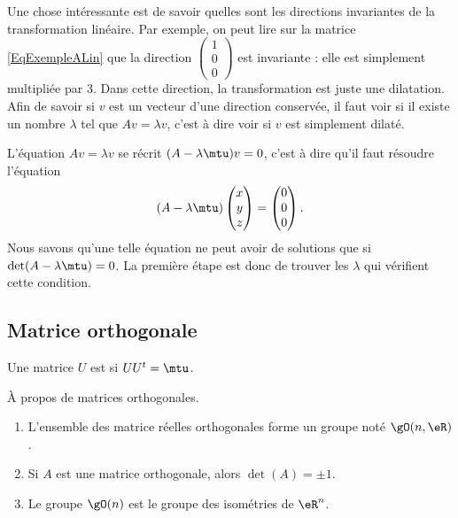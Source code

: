 Une chose intéressante est de savoir quelles sont les directions invariantes de la transformation linéaire. Par exemple, on peut lire sur la matrice \eqref{EqExempleALin} que la direction $\begin{pmatrix}
	1	\\ 
	0	\\ 
	0	
\end{pmatrix}$ est invariante : elle est simplement multipliée par $3$. Dans cette direction, la transformation est juste une dilatation. Afin de savoir si $v$ est un vecteur d'une direction conservée, il faut voir si il existe un nombre $\lambda$ tel que $Av=\lambda v$, c'est à dire voir si $v$ est simplement dilaté.

L'équation $Av=\lambda v$ se récrit $(A-\lambda\mtu)v=0$, c'est à dire qu'il faut résoudre l'équation
\begin{equation}
	(A-\lambda\mtu)\begin{pmatrix}
		x	\\ 
		y	\\ 
		z	
	\end{pmatrix}=
	\begin{pmatrix}
		0	\\ 
		0	\\ 
		0	
	\end{pmatrix}.
\end{equation}
Nous savons qu'une telle équation ne peut avoir de solutions que si $\det(A-\lambda\mtu)=0$. La première étape est donc de trouver les $\lambda$ qui vérifient cette condition.

\subsection{Matrice orthogonale}

\begin{definition}
    Une matrice \( U\) est  si \( UU^t=\mtu\).
\end{definition}

\begin{proposition}     \label{PropKBCXooOuEZcS}
    À propos de matrices orthogonales.
    \begin{enumerate}
        \item
            L'ensemble des matrice réelles orthogonales forme un groupe noté \( \gO(n,\eR)\).
        \item
            Si \( A\) est une matrice orthogonale, alors \( \det(A)=\pm 1\).
        \item
            Le groupe \( \gO(n)\) est le groupe des isométries de \( \eR^n\).
    \end{enumerate}
\end{proposition}

